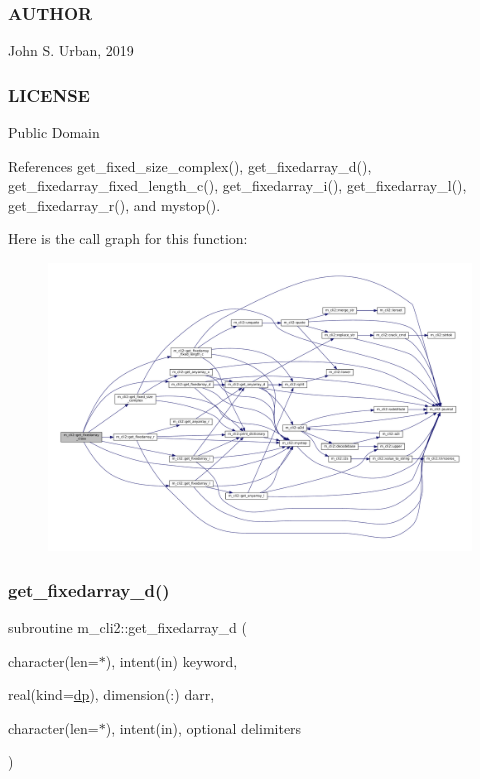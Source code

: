 \subsubsection*{A\+U\+T\+H\+OR}

John S. Urban, 2019 \subsubsection*{L\+I\+C\+E\+N\+SE}

Public Domain 

References get\+\_\+fixed\+\_\+size\+\_\+complex(), get\+\_\+fixedarray\+\_\+d(), get\+\_\+fixedarray\+\_\+fixed\+\_\+length\+\_\+c(), get\+\_\+fixedarray\+\_\+i(), get\+\_\+fixedarray\+\_\+l(), get\+\_\+fixedarray\+\_\+r(), and mystop().

Here is the call graph for this function\+:
\nopagebreak
\begin{figure}[H]
\begin{center}
\leavevmode
\includegraphics[width=350pt]{namespacem__cli2_a6d8c1c441ac15f9a2882e50459d39565_cgraph}
\end{center}
\end{figure}
\mbox{\label{namespacem__cli2_a2c8db0f383888cb2b3ce8643de3fae93}} 
\subsubsection{\texorpdfstring{get\+\_\+fixedarray\+\_\+d()}{get\_fixedarray\_d()}}
{\footnotesize\ttfamily subroutine m\+\_\+cli2\+::get\+\_\+fixedarray\+\_\+d (\begin{DoxyParamCaption}\item[{character(len=$\ast$), intent(in)}]{keyword,  }\item[{real(kind=\mbox{\hyperlink{namespacem__cli2_acf83f1963cf6a56ad0221cfcf5402440}{dp}}), dimension(\+:)}]{darr,  }\item[{character(len=$\ast$), intent(in), optional}]{delimiters }\end{DoxyParamCaption})\hspace{0.3cm}{\ttfamily [private]}}




